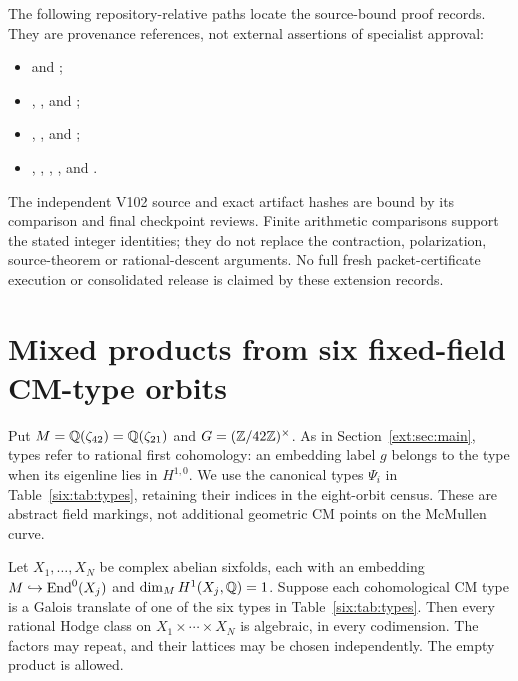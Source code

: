 The following repository-relative paths locate the source-bound proof
records. They are provenance references, not external assertions of
specialist approval:
\begin{itemize}
\item {}
and ;
\item {},
, and
;
\item {},
, and
;
\item {},
,
,
, and
.
\end{itemize}
The independent V102 source and exact artifact hashes are bound by its
comparison and final checkpoint reviews. Finite arithmetic comparisons
support the stated integer identities; they do not replace the
contraction, polarization, source-theorem or rational-descent arguments.
No full fresh packet-certificate execution or consolidated release is
claimed by these extension records.

\section{Mixed products from six fixed-field CM-type orbits}
\label{six:sec:main}
Put $M=\mathbb Q(\zeta_{42})=\mathbb Q(\zeta_{21})$ and
$G=(\mathbb Z/42\mathbb Z)^\times$. As in Section~\ref{ext:sec:main}, types refer to
rational first cohomology: an embedding label $g$ belongs to the type
when its eigenline lies in $H^{1,0}$. We use the canonical types $\Psi_i$
in Table~\ref{six:tab:types}, retaining their indices in the eight-orbit
census. These are abstract field markings, not additional geometric
CM points on the McMullen curve.

\begin{theorem}\label{six:thm:products}
Let $X_1,\ldots,X_N$ be complex abelian sixfolds, each with an embedding
$M\hookrightarrow\operatorname{End}^0(X_j)$ and $\dim_M H^1(X_j,\mathbb Q)=1$. Suppose each cohomological
CM type is a Galois translate of one of the six types in
Table~\ref{six:tab:types}. Then every rational Hodge class on
$X_1\times\cdots\times X_N$ is algebraic, in every codimension.
The factors may repeat, and their lattices may be chosen independently.
The empty product is allowed.
\end{theorem}

